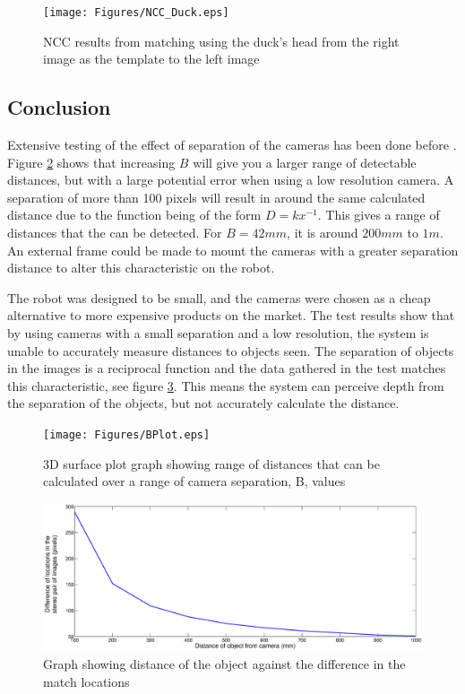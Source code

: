 \begin{figure}
\texttt{[image: Figures/NCC\_Duck.eps]}
\caption{NCC results from matching using the duck's head from the right image as the template to the left image}
\label{fig:duck:ncc}
\end{figure}

\subsection{Conclusion}

Extensive testing of the effect of separation of the cameras has been done before \citep{Mrovlje:Distance_Stereoscopic}. Figure \ref{fig:B:Plot} shows that increasing $B$ will give you a larger range of detectable distances, but with a large potential error when using a low resolution camera. A separation of more than 100 pixels will result in around the same calculated distance due to the function being of the form $D =kx^{-1}$. This gives a range of distances that the can be detected. For $B=42mm$, it is around $200mm$ to $1m$. An external frame could be made to mount the cameras with a greater separation distance to alter this characteristic on the robot.

The robot was designed to be small, and the cameras were chosen as a cheap alternative to more expensive products on the market. The test results show that by using cameras with a small separation and a low resolution, the system is unable to accurately measure distances to objects seen. The separation of objects in the images is a reciprocal function and the data gathered in the test matches this characteristic, see figure \ref{fig:Distance:DeltaX}. This means the system can perceive depth from the separation of the objects, but not accurately calculate the distance. 

\begin{figure}
\texttt{[image: Figures/BPlot.eps]}
\caption{3D surface plot graph showing range of distances that can be calculated over a range of camera separation, B, values}
\label{fig:B:Plot}
\end{figure}
\begin{figure}
\includegraphics[width=\textwidth]{Figures/Distance_DeltaX.eps}
\caption{Graph showing distance of the object against the difference in the match locations}
\label{fig:Distance:DeltaX}
\end{figure}
